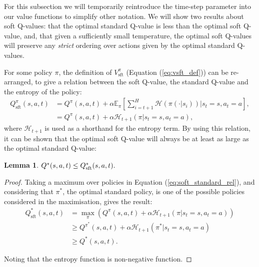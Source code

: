 \documentclass{article}
\newcommand{\bb}[1]{\mathbb{#1}}
\newcommand{\cl}[1]{\mathcal{#1}}
\theoremstyle{plain}
\newtheorem{lemma}[theorem]{Lemma}
\begin{document}
\begin{appendices}
    
        For this subsection we will temporarily reintroduce the time-step parameter into our value functions to simplify other notation. We will show two results about soft Q-values: that the optimal standard Q-value is less than the optimal soft Q-value, and, that given a sufficiently small temperature, the optimal soft Q-values will preserve any \textit{strict} ordering over actions given by the optimal standard Q-values. 





    
        For some policy $\pi$, the definition of $V^{\pi}_{\text{sft}}$ (Equation (\ref{eq:vsft_def})) can be re-arranged, to give a relation between the soft Q-value, the standard Q-value and the entropy of the policy:
        \begin{align}
            Q^{\pi}_{\text{sft}}(s,a,t) &= Q^{\pi}(s,a,t) 
                + \alpha \bb{E}_{\pi}\left[
                    \sum_{i=t+1}^H \cl{H}\left(\pi(\cdot|s_i)\right) \Bigg| s_t=s, a_t=a
                    \right], \label{eq:soft_standard_rel} \\
                &= Q^{\pi}(s,a,t) 
                + \alpha\cl{H}_{t+1}(\pi|s_t=s,a_t=a),
        \end{align}
        where $\cl{H}_{t+1}$ is used as a shorthand for the entropy term. By using this relation, it can be shown that the optimal soft Q-value will always be at least as large as the optimal standard Q-value:
        \begin{lemma} \label{lem:soft_geq_standard}
            $Q^*(s,a,t) \leq Q_{\textnormal{sft}}^*(s,a,t).$
        \end{lemma}
        \begin{proof}
            Taking a maximum over policies in Equation (\ref{eq:soft_standard_rel}), and considering that $\pi^*$, the optimal standard policy, is one of the possible policies considered in the maximisation, gives the result:
            \begin{align}
                Q_{\text{sft}}^*(s,a,t) &= \max_\pi \left(Q^{\pi}(s,a,t) + \alpha\cl{H}_{t+1}(\pi|s_t=s,a_t=a)\right) \\
                    &\geq Q^{\pi^*}(s,a,t) + \alpha\cl{H}_{t+1}(\pi^*|s_t=s,a_t=a) \\
                    &\geq Q^*(s,a,t).
            \end{align} 
            
            Noting that the entropy function is non-negative function.
        \end{proof}
    

\end{appendices}
\end{document}
